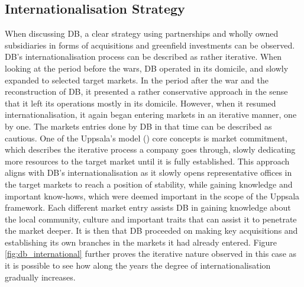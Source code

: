 \documentclass[11pt,a4paper]{article}
\begin{document}
{{{\subsection{Internationalisation Strategy}
\vspace{-1mm}
\label{int_strategy}
 \par
When discussing DB, a clear strategy using partnerships and wholly owned subsidiaries in forms of acquisitions and greenfield investments can be observed. DB's internationalisation process can be described as rather iterative. When looking at the period before the wars, DB operated in its domicile, and slowly expanded to selected target markets. In the period after the war and the reconstruction of DB, it presented a rather conservative approach in the sense that it left its operations mostly in its domicile. However, when it resumed internationalisation, it again began entering markets in an iterative manner, one by one. The markets entries done by DB in that time can be described as cautious. One of the Uppsala's model (\citeyear{johansonInternationalizationProcessFirm1977}) core concepts is market commitment, which describes the iterative process a company goes through, slowly dedicating more resources to the target market until it is fully established. This approach aligns with DB's internationalisation as it slowly opens representative offices in the target markets to reach a position of stability, while gaining knowledge and important know-hows, which were deemed important in the scope of the Uppsala framework. Each different market entry assists DB in gaining knowledge about the local community, culture and important traits that can assist it to penetrate the market deeper. It is then that DB proceeded on making key acquisitions and establishing its own branches in the markets it had already entered. Figure \ref{fig:db_international} further proves the iterative nature observed in this case as it is possible to see how along the years the degree of internationalisation gradually increases. \par 
}}}
\end{document}
